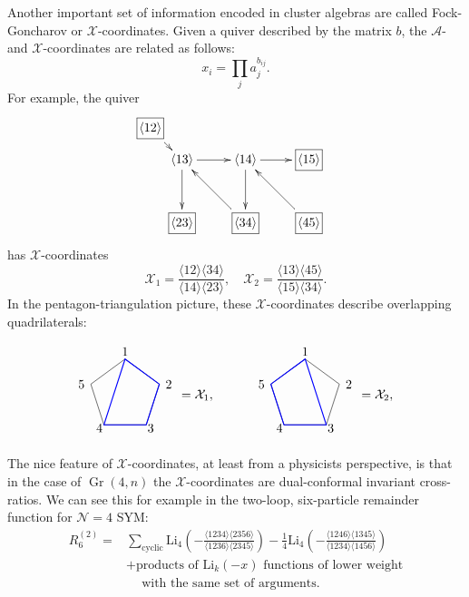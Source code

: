 \documentclass[11pt]{article}
\DeclareMathOperator{\Gr}{Gr}
\def\ket#1{\langle #1 \rangle}
\def\nl{\nonumber\\}
\def\nn{\nonumber}
\def\x{\mathcal{X}}
\def\a{\mathcal{A}}
\def\drawLabeledPentagon{
\coordinate (P1) at (90:1);
\coordinate (P2) at (18:1);
\coordinate (P3) at (306:1);
\coordinate (P4) at (234:1);
\coordinate (P5) at (162:1);
\draw (P1) -- (P2) -- (P3) -- (P4) -- (P5) -- cycle;
\draw (0,1.2) node {1};
\draw (1,.3) node[anchor=west] {2};
\draw (.5,-.9) node[anchor=west] {3};
\draw (-.5,-.9) node[anchor=east] {4};
\draw (-1,.3) node[anchor=east] {5};
}
\begin{document}
Another important set of information encoded in cluster algebras are called Fock-Goncharov or $\x$-coordinates. Given a quiver described by the matrix $b$, the $\a$- and $\x$-coordinates are related as follows:
\begin{equation}
	x_i = \prod_j a_j^{b_{ij}}. 	
\end{equation} 
For example, the quiver 
\begin{equation}
\begin{gathered}
\begin{xy} 0;<1pt,0pt>:<0pt,-1pt>::
	(25,25) *+{\langle 13\rangle} ="0",
	(75,25) *+{\langle 14\rangle} ="1",
	(125,25) *+{\framebox[5ex]{$\langle 15\rangle$}} ="2",
	(125,75) *+{\framebox[5ex]{$\langle 45\rangle$}} ="3",
	(75,75) *+{\framebox[5ex]{$\langle 34\rangle$}} ="4",
	(25,75) *+{\framebox[5ex]{$\langle 23\rangle$}} ="5",
	(0,0) *+{\framebox[5ex]{$\langle 12\rangle$}} ="6",
	(145,75) *+{},
	"0", {\ar"1"},
	"4", {\ar"0"},
	"0", {\ar"5"},
	"6", {\ar"0"},
	"1", {\ar"2"},
	"3", {\ar"1"},
	"1", {\ar"4"},
\end{xy}
\end{gathered}
\end{equation}
has $\x$-coordinates 
\begin{equation}\label{def:xcoordsA2}
	\x_1 = \frac{\ket{12}\ket{34}}{\ket{14}\ket{23}}, \quad \x_2 = \frac{\ket{13}\ket{45}}{\ket{15}\ket{34}}.
\end{equation}
In the pentagon-triangulation picture, these $\x$-coordinates describe overlapping quadrilaterals:
\begin{center}
\begin{equation}
\begin{tikzpicture}
  \drawLabeledPentagon
  \draw[color=blue, thick] (P1) -- (P2) -- (P3) -- (P4) -- cycle;
  \draw (2,0) node {$=\x_1,$};
\begin{scope}[xshift = 5cm]
  \drawLabeledPentagon
  \draw[color=blue, thick] (P1) -- (P3) -- (P4) -- (P5) -- cycle;
  \draw (2,0) node {$=\x_2,$};
\end{scope}
\end{tikzpicture} 
\end{equation}
\end{center}
The nice feature of $\x$-coordinates, at least from a physicists perspective, is that in the case of $\Gr(4,n)$ the $\x$-coordinates are dual-conformal invariant cross-ratios. We can see this for example in the two-loop, six-particle remainder function for $\mathcal{N}=4$ SYM:
\begin{align}
	R^{(2)}_6 = &\sum_{\text{cyclic}} \text{Li}_4\left(-\frac{\langle 1234 \rangle \langle 2356 \rangle}{\langle 1236 \rangle \langle 2345 \rangle}\right) - \frac{1}{4} \text{Li}_4 \left(-\frac{\langle 1246 \rangle \langle 1345 \rangle}{\langle 1234 \rangle \langle 1456 \rangle}\right)\nl
	&+\text{products of } \text{Li}_{k}(-x) \text{ functions of lower weight}\\ &\quad~\text{with the same set of arguments.}\nn
\end{align}
\end{document}
